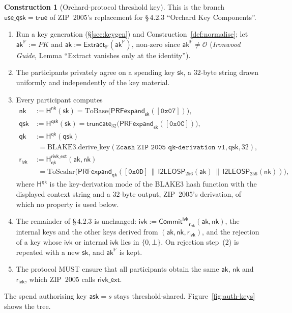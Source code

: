 \documentclass[11pt,a4paper]{article}
\theoremstyle{definition}
\newtheorem{construction}[theorem]{Construction}
\newcommand{\PP}{\mathbb{P}}
\newcommand{\CommitIvk}{\ensuremath{\mathsf{Commit}^{\mathsf{ivk}}}}
\newcommand{\Extract}{\ensuremath{\mathsf{Extract}}}
\newcommand{\ask}{\ensuremath{\mathsf{ask}}}
\newcommand{\aksym}{\ensuremath{\mathsf{ak}}}
\newcommand{\nksym}{\ensuremath{\mathsf{nk}}}
\newcommand{\ivk}{\ensuremath{\mathsf{ivk}}}
\newcommand{\rivk}{\ensuremath{\mathsf{r_{ivk}}}}
\begin{document}
\begin{construction}[Orchard-protocol threshold key]\label{def:orchard-key}
This is the branch \(\mathsf{use\_qsk} = \mathsf{true}\) of ZIP~2005's
replacement for \S\,4.2.3 ``Orchard Key Components''.
\begin{enumerate}
\item Run a key generation (\S\ref{sec:keygen}) and
  Construction~\ref{def:normalise}; let
  \(\aksym^{\PP} := \mathit{PK}\) and
  \(\aksym := \Extract_{\PP}(\aksym^{\PP})\), non-zero since
  \(\aksym^{\PP} \ne \mathcal{O}\) (\emph{Ironwood Guide}, Lemma ``Extract
  vanishes only at the identity'').
\item The participants privately agree on a spending key \(\mathsf{sk}\), a
  \(32\)-byte string drawn uniformly and independently of the key material.
\item Every participant computes
  \begin{align*}
    \nksym &:= \mathsf{H}^{\mathsf{nk}}(\mathsf{sk})
      = \mathrm{ToBase}\bigl(\mathsf{PRFexpand}_{\mathsf{sk}}
        ([\mathtt{0x07}])\bigr) , \\
    \mathsf{qsk} &:= \mathsf{H}^{\mathsf{qsk}}(\mathsf{sk})
      = \mathsf{truncate}_{32}\bigl(\mathsf{PRFexpand}_{\mathsf{sk}}
        ([\mathtt{0x0C}])\bigr) , \\
    \mathsf{qk} &:= \mathsf{H}^{\mathsf{qk}}(\mathsf{qsk}) \\
      &\phantom{:}= \mathrm{BLAKE3.derive\_key}(
        \texttt{Zcash ZIP 2005 qk-derivation v1}, \mathsf{qsk}, 32) , \\
    \rivk &:= \mathsf{H}^{\mathsf{rivk\_ext}}_{\mathsf{qk}}(\aksym, \nksym) \\
      &\phantom{:}= \mathrm{ToScalar}\bigl(\mathsf{PRFexpand}_{\mathsf{qk}}
        ([\mathtt{0x0D}] \,\|\, \mathsf{I2LEOSP}_{256}(\aksym) \,\|\,
        \mathsf{I2LEOSP}_{256}(\nksym))\bigr) ,
  \end{align*}
  where \(\mathsf{H}^{\mathsf{qk}}\) is the key-derivation mode of the BLAKE3
  hash function with the displayed context string and a \(32\)-byte output,
  ZIP~2005's derivation, of which no property is used below.
\item The remainder of \S\,4.2.3 is unchanged:
  \(\ivk := \CommitIvk_{\rivk}(\aksym, \nksym)\), the internal keys and the
  other keys derived from \((\aksym, \nksym, \rivk)\), and the rejection of
  a key whose \(\ivk\) or internal \(\ivk\) lies in \(\{0, \bot\}\). On
  rejection step~(2) is repeated with a new \(\mathsf{sk}\), and
  \(\aksym^{\PP}\) is kept.
\item The protocol MUST ensure that all participants obtain the same
  \(\aksym\), \(\nksym\) and \(\rivk\), which ZIP~2005 calls
  \(\mathsf{rivk\_ext}\).
\end{enumerate}
The spend authorising key \(\ask = s\) stays threshold-shared.
Figure~\ref{fig:auth-keys} shows the tree.
\end{construction}
\end{document}
